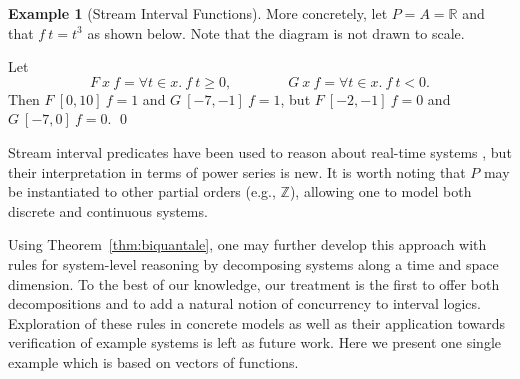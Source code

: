 \documentclass[12pt]{article}
\theoremstyle{definition}
\newtheorem{example}{Example}
\begin{document}
\begin{example}[Stream Interval
  Functions]
  More concretely, let $P=A=\mathbb{R}$ and that $f\ t=t^3$ as shown
  below. Note that the diagram is not drawn to scale. 
  \begin{center}
  \end{center}
  Let
  \begin{equation*}
    F\ x\
    f= \forall t\in x.\ f\ t\ge 0,\qquad\qquad G\ x\ f =\forall t\in x.\ f\
    t<0.
  \end{equation*}
  Then $F\ [0,10]\ f=1$ and $G\ [-7,-1]\ f=1$, but $F\ [-2,-1]\ f=0$
  and $G\ [-7,0]\ f=0$.  \qed
\end{example}

Stream interval predicates have been used to reason about real-time
systems \cite{DHD14}, but their interpretation in terms of power
series is new.  It is worth noting that $P$ may be instantiated to
other partial orders (e.g., $\mathbb{Z}$), allowing one to model both
discrete and continuous systems. 

Using Theorem~\ref{thm:biquantale}, one may further develop this
approach with rules for system-level reasoning by decomposing systems
along a time and space dimension. To the best of our knowledge, our
treatment is the first to offer both decompositions and to add a
natural notion of concurrency to interval logics. Exploration of these
rules in concrete models as well as their application towards
verification of example systems is left as future work. Here we
present one single example which is based on vectors of functions.
\end{document}
